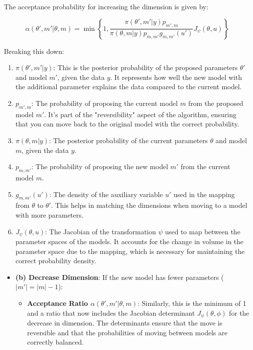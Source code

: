 \documentclass[10pt]{article}
\begin{document}
The acceptance probability for increasing the dimension is given by:

\[ \alpha(\theta', m'|\theta, m) = \min \left\{ 1, \frac{\pi(\theta', m'|y)p_{m',m}}{\pi(\theta, m|y)p_{m,m'}g_{m,m'}(u')}J_\psi(\theta, u) \right\} \]

Breaking this down:

\begin{enumerate}
  \item \( \pi(\theta', m'|y) \): This is the posterior probability of the proposed parameters \( \theta' \) and model \( m' \), given the data \( y \). It represents how well the new model with the additional parameter explains the data compared to the current model.

  \item \( p_{m',m} \): The probability of proposing the current model \( m \) from the proposed model \( m' \). It's part of the "reversibility" aspect of the algorithm, ensuring that you can move back to the original model with the correct probability.

  \item \( \pi(\theta, m|y) \): The posterior probability of the current parameters \( \theta \) and model \( m \), given the data \( y \).

  \item \( p_{m,m'} \): The probability of proposing the new model \( m' \) from the current model \( m \).

  \item \( g_{m,m'}(u') \): The density of the auxiliary variable \( u' \) used in the mapping from \( \theta \) to \( \theta' \). This helps in matching the dimensions when moving to a model with more parameters.

  \item \( J_\psi(\theta, u) \): The Jacobian of the transformation \( \psi \) used to map between the parameter spaces of the models. It accounts for the change in volume in the parameter space due to the mapping, which is necessary for maintaining the correct probability density.

\end{enumerate}

\begin{itemize}
  \item \textbf{(b) Decrease Dimension}: If the new model has fewer parameters (\( |m'| = |m| - 1 \)):
  \begin{itemize}
    \item \textbf{Acceptance Ratio \( \alpha(\theta', m'|\theta, m) \)}: Similarly, this is the minimum of 1 and a ratio that now includes the Jacobian determinant \( J_{\psi}(\theta, \phi) \) for the decrease in dimension. The determinants ensure that the move is reversible and that the probabilities of moving between models are correctly balanced.
  \end{itemize}
\end{itemize}
\end{document}
